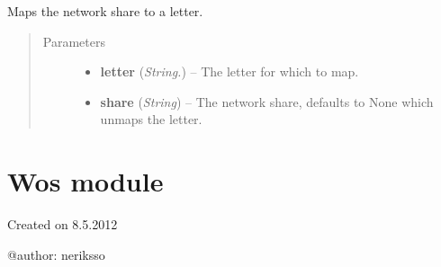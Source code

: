 \documentclass[letterpaper,10pt,english]{sphinxmanual}
\begin{document}

\begin{fulllineitems}
\label{api:utils.MapNetworkShare}
Maps the network share to a letter.
\begin{quote}\begin{description}
\item[{Parameters}] \leavevmode\begin{itemize}
\item {} 
\textbf{letter} (\emph{String.}) -- The letter for which to map.

\item {} 
\textbf{share} (\emph{String}) -- The network share, defaults to None which unmaps the letter.

\end{itemize}

\end{description}\end{quote}

\end{fulllineitems}



\section{Wos module}
\label{api:wos-module}\label{api:module-wos}
Created on 8.5.2012

@author: neriksso
\end{document}
